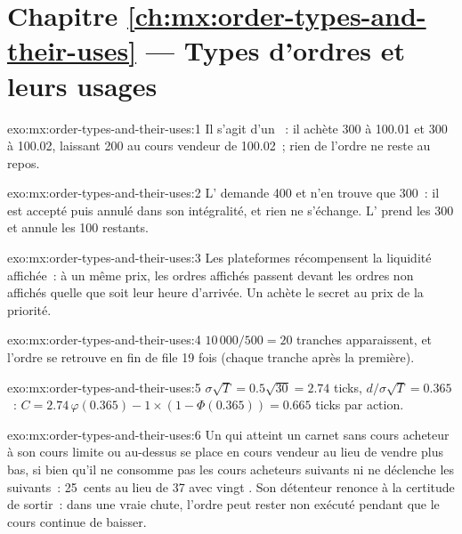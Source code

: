 \section*{Chapitre \ref{ch:mx:order-types-and-their-uses} --- Types d'ordres et leurs usages}

\begin{solution}{exo:mx:order-types-and-their-uses:1}
Il s'agit d'un ~: il achète 300 à 100.01 et 300 à 100.02, laissant 200 au cours vendeur de 100.02~; rien de l'ordre ne reste au repos.
\end{solution}

\begin{solution}{exo:mx:order-types-and-their-uses:2}
L' demande 400 et n'en trouve que 300~: il est accepté puis annulé dans son intégralité, et rien ne s'échange. L' prend les 300
et annule les 100 restants.
\end{solution}

\begin{solution}{exo:mx:order-types-and-their-uses:3}
Les plateformes récompensent la liquidité affichée~: à un même prix, les ordres affichés passent devant les ordres non affichés quelle que soit leur heure d'arrivée. Un  achète
le secret au prix de la priorité.
\end{solution}

\begin{solution}{exo:mx:order-types-and-their-uses:4}
$10\,000/500=20$ tranches apparaissent, et l'ordre se retrouve en fin de file 19 fois (chaque tranche après la première).
\end{solution}

\begin{solution}{exo:mx:order-types-and-their-uses:5}
$\sigma\sqrt T=0.5\sqrt{30}=2.74$ ticks, $d/\sigma\sqrt T=0.365$~: $C=2.74\,\varphi(0.365)-1\times(1-\Phi(0.365))=0.665$ ticks par action.
\end{solution}

\begin{solution}{exo:mx:order-types-and-their-uses:6}
Un  qui atteint un carnet sans cours acheteur à son cours limite ou au-dessus se place en cours vendeur au lieu de vendre plus bas, si bien qu'il ne consomme pas les cours acheteurs suivants ni ne déclenche les
 suivants~: 25~cents au lieu de 37 avec vingt . Son détenteur renonce à la certitude de sortir~: dans une vraie chute, l'ordre peut
rester non exécuté pendant que le cours continue de baisser.
\end{solution}


